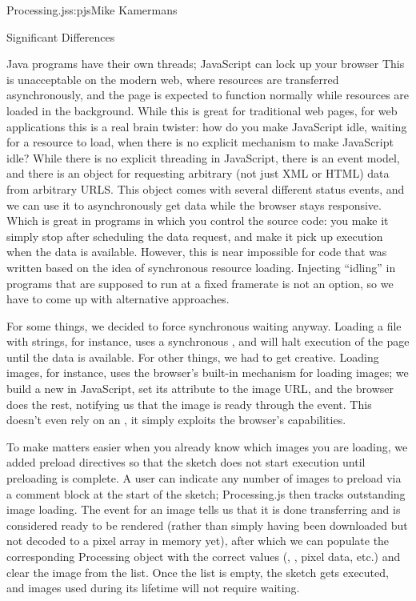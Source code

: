 \begin{aosachapter}{Processing.js}{s:pjs}{Mike Kamermans}
\begin{aosasect1}{Significant Differences}
\begin{aosasect3}{Java programs have their own threads; JavaScript can lock up your browser}
This is unacceptable on the modern web, where resources are
transferred asynchronously, and the page is expected to function
normally while resources are loaded in the background. While this is
great for traditional web pages, for web applications this is a real
brain twister: how do you make JavaScript idle, waiting for a resource
to load, when there is no explicit mechanism to make JavaScript idle?
While there is no explicit threading in JavaScript, there is an event
model, and there is an  object for requesting arbitrary
(not just XML or HTML) data from arbitrary URLS. This object comes
with several different status events, and we can use it to
asynchronously get data while the browser stays responsive. Which is
great in programs in which you control the source code: you make it
simply stop after scheduling the data request, and make it pick up
execution when the data is available. However, this is near impossible
for code that was written based on the idea of synchronous resource
loading. Injecting ``idling'' in programs that are supposed to run at a
fixed framerate is not an option, so we have to come up with
alternative approaches.

For some things, we decided to force synchronous waiting
anyway. Loading a file with strings, for instance, uses a synchronous
, and will halt execution of the page until the data is
available. For other things, we had to get creative. Loading images,
for instance, uses the browser's built-in mechanism for loading
images; we build a new  in JavaScript, set its 
attribute to the image URL, and the browser does the rest, notifying
us that the image is ready through the  event. This
doesn't even rely on an , it simply exploits the
browser's capabilities.

To make matters easier when you already know which images you are
loading, we added preload directives so that the sketch does not start
execution until preloading is complete. A user can indicate any number
of images to preload via a comment block at the start of the sketch;
Processing.js then tracks outstanding image loading. The 
event for an image tells us that it is done transferring and is
considered ready to be rendered (rather than simply having been
downloaded but not decoded to a pixel array in memory yet), after
which we can populate the corresponding Processing 
object with the correct values (, , pixel
data, etc.) and clear the image from the list. Once the list is empty,
the sketch gets executed, and images used during its lifetime will not
require waiting.


\end{aosasect3}
\end{aosasect1}
\end{aosachapter}
